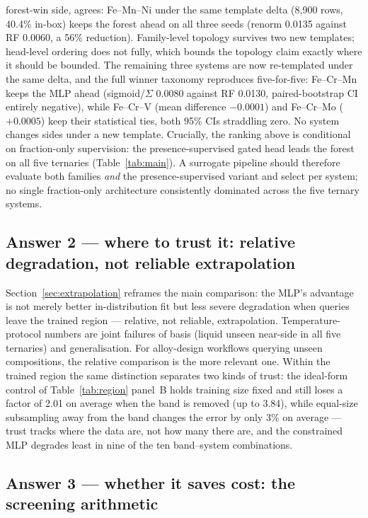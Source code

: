 \documentclass[preprint,12pt,authoryear]{elsarticle}
\begin{document}
forest-win side, agrees: Fe--Mn--Ni under the same template delta
(8{,}900 rows, 40.4\% in-box) keeps the forest ahead on all three seeds
(renorm 0.0135 against RF 0.0060, a 56\% reduction). Family-level topology survives
two new templates; head-level ordering does not fully, which bounds the
topology claim exactly where it should be bounded. The remaining three
systems are now re-templated under the same delta, and the full winner
taxonomy reproduces five-for-five: Fe--Cr--Mn keeps the MLP ahead
(sigmoid/$\Sigma$ 0.0080 against RF 0.0130, paired-bootstrap CI entirely
negative), while Fe--Cr--V (mean difference $-0.0001$) and Fe--Cr--Mo
($+0.0005$) keep their statistical ties, both 95\% CIs straddling zero.
No system changes sides under a new template. Crucially, the ranking above is conditional on fraction-only
supervision: the presence-supervised gated head leads the forest on all
five ternaries (Table~\ref{tab:main}). A surrogate pipeline should
therefore evaluate both families \emph{and} the presence-supervised variant
and select per system; no single fraction-only architecture consistently
dominated across the five ternary systems.

\subsection{Answer 2 --- where to trust it: relative degradation, not
reliable extrapolation}

Section~\ref{sec:extrapolation} reframes the main comparison: the MLP's
advantage is not merely better in-distribution fit but less severe
degradation when queries leave the trained region --- relative, not
reliable, extrapolation. Temperature-protocol numbers are joint failures
of basis (liquid unseen near-side in all five ternaries) and
generalisation. For alloy-design workflows querying unseen compositions,
the relative comparison is the more relevant one.
Within the trained region the same distinction separates two kinds of
trust: the ideal-form control of Table~\ref{tab:region} panel~B holds
training size fixed and still loses a factor of 2.01 on average when
the band is removed (up to 3.84), while equal-size subsampling away
from the band changes the error by only 3\% on average --- trust tracks
where the data are, not how many there are, and the constrained MLP
degrades least in nine of the ten band--system combinations.

\subsection{Answer 3 --- whether it saves cost: the screening arithmetic}
\end{document}
